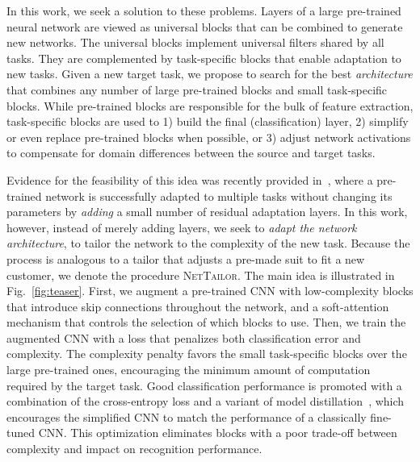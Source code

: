 \documentclass[10pt,twocolumn,letterpaper]{article}
\begin{document}
In this work, we seek a solution to these problems. Layers of a large pre-trained neural network are viewed as universal blocks that can be combined to generate new networks. 
The universal blocks implement universal filters shared by all tasks. They are complemented by task-specific blocks that enable adaptation to new tasks. Given a new target task, we propose to search for the best {\it architecture\/} that combines any number of large pre-trained blocks and small task-specific blocks.
While pre-trained blocks are responsible for the bulk of feature extraction, task-specific blocks are used to 1) build the final (classification) layer, 2) simplify or even replace pre-trained blocks when possible, or 3) adjust network activations to compensate for domain differences between the source and target tasks.

Evidence for the feasibility of this idea was recently provided in~\cite{rebuffi2017learning}, where a pre-trained network is successfully adapted to multiple tasks without changing its parameters by \textit{adding} a small number of residual adaptation layers. 
In this work, however, instead of merely adding layers, we seek to {\it adapt the network architecture\/}, to tailor the network to the complexity of the new task. 
Because the process is analogous to a tailor that adjusts a pre-made suit to fit a new customer, we denote the procedure \textsc{NetTailor}. 
The main idea is illustrated in Fig.~\ref{fig:teaser}. First, we augment a pre-trained CNN with low-complexity blocks that introduce skip connections throughout the network, and a soft-attention mechanism that controls the selection of which blocks to use.
Then, we train the augmented CNN with a loss that penalizes both classification error and complexity. 
The complexity penalty favors the small task-specific blocks over the large pre-trained ones, encouraging the minimum amount of computation required by the target task.
Good classification performance is promoted with a combination of the cross-entropy loss and a variant of model distillation~\cite{hinton2015distilling}, which encourages the simplified CNN to match the performance of a classically fine-tuned CNN.
This optimization eliminates blocks with a poor trade-off between complexity and impact on recognition performance.
\end{document}
